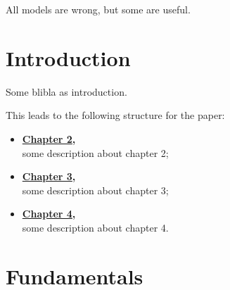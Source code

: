 
\begingroup
\begin{fquote}
    All models are wrong, but some are useful.
\end{fquote}
\let\cleardoublepage\relax
\vspace*{1cm}

\chapter{Introduction}
\label{chap:intro}
\endgroup

Some blibla as introduction. \autocite{batchuComparativeStudyEqual2022}
\lipsum[1-2]

This leads to the following structure for the paper: 
\begin{itemize}
    \item \textbf{\hyperref[chap:fundamentals]{Chapter 2},}\\
    some description about chapter 2;
    \item \textbf{\hyperref[chap:methods]{Chapter 3},}\\
    some description about chapter 3;
    \item \textbf{\hyperref[chap:results]{Chapter 4},}\\
    some description about chapter 4.
\end{itemize}

\chapter{Fundamentals}
